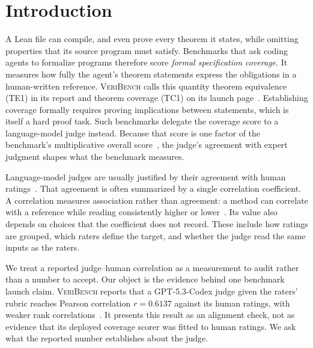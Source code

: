 \section{Introduction}
\label{sec:intro}
A Lean file can compile, and even prove every theorem it states, while omitting properties that its source program must satisfy.
Benchmarks that ask coding agents to formalize programs therefore score \emph{formal specification coverage}.
It measures how fully the agent's theorem statements express the obligations in a human-written reference.
\textsc{VeriBench} calls this quantity theorem equivalence (TE1) in its report and theorem coverage (TC1) on its launch page~\citep{veribench2026}.
Establishing coverage formally requires proving implications between statements, which is itself a hard proof task.
Such benchmarks delegate the coverage score to a language-model judge instead.
Because that score is one factor of the benchmark's multiplicative overall score~\citep{veribench2026}, the judge's agreement with expert judgment shapes what the benchmark measures.

Language-model judges are usually justified by their agreement with human ratings~\citep{zheng2023judging,liu2023geval,chiang2023can}.
That agreement is often summarized by a single correlation coefficient.
A correlation measures association rather than agreement: a method can correlate with a reference while reading consistently higher or lower~\citep{bland1986statistical}.
Its value also depends on choices that the coefficient does not record.
These include how ratings are grouped, which raters define the target, and whether the judge read the same inputs as the raters.

We treat a reported judge--human correlation as a measurement to audit rather than a number to accept.
Our object is the evidence behind one benchmark launch claim.
\textsc{VeriBench} reports that a GPT-5.3-Codex judge given the raters' rubric reaches Pearson correlation $r=0.6137$ against its human ratings, with weaker rank correlations~\citep{veribench2026}.
It presents this result as an alignment check, not as evidence that its deployed coverage scorer was fitted to human ratings.
We ask what the reported number establishes about the judge.

